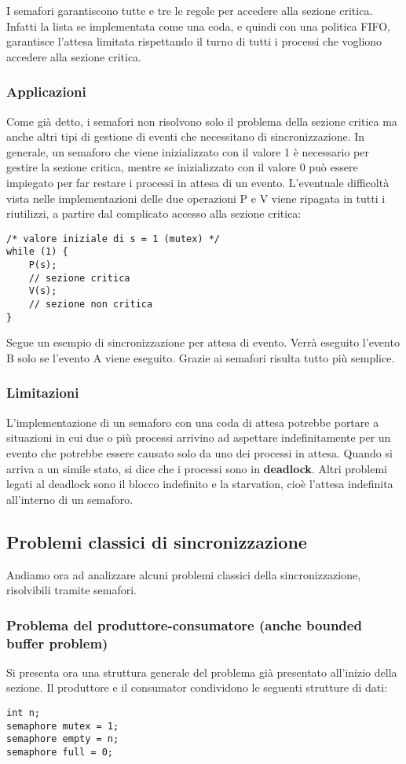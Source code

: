 \documentclass[a4]{article}
\begin{document}
I semafori garantiscono tutte e tre le regole per accedere alla sezione critica. Infatti la lista se implementata come una coda, e quindi con una politica FIFO, garantisce l’attesa limitata rispettando il turno di tutti i processi che vogliono accedere alla sezione critica.

\subsubsection{Applicazioni}
Come già detto, i semafori non risolvono solo il problema della sezione critica ma anche altri tipi di gestione di eventi che necessitano di sincronizzazione. In generale, un semaforo che viene inizializzato con il valore 1 è necessario per gestire la sezione critica, mentre se inizializzato con il valore 0 può essere impiegato per far restare i processi in attesa di un evento. L'eventuale difficoltà vista nelle implementazioni delle due operazioni P e V viene ripagata in tutti i riutilizzi, a partire dal complicato accesso alla sezione critica:
\begin{verbatim}
/* valore iniziale di s = 1 (mutex) */
while (1) {
    P(s);
    // sezione critica
    V(s);
    // sezione non critica
}
\end{verbatim}
Segue un esempio di sincronizzazione per attesa di evento. Verrà eseguito l’evento B solo se l’evento A viene eseguito. Grazie ai semafori risulta tutto più semplice.

\subsubsection{Limitazioni}
L'implementazione di un semaforo con una coda di attesa potrebbe portare a situazioni in cui due o più processi arrivino ad aspettare indefinitamente per un evento che potrebbe essere causato solo da uno dei processi in attesa. Quando si arriva a un simile stato, si dice che i processi sono in \textbf{deadlock}. Altri problemi legati al deadlock sono il blocco indefinito e la starvation, cioè l'attesa indefinita all'interno di un semaforo.

\subsection{Problemi classici di sincronizzazione}
Andiamo ora ad analizzare alcuni problemi classici della sincronizzazione, risolvibili tramite semafori.

\subsubsection{Problema del produttore-consumatore (anche bounded buffer problem)}
Si presenta ora una struttura generale del problema già presentato all'inizio della sezione. Il produttore e il consumator condividono le seguenti strutture di dati:
\begin{verbatim}
int n;
semaphore mutex = 1;
semaphore empty = n;
semaphore full = 0;
\end{verbatim}
\end{document}
